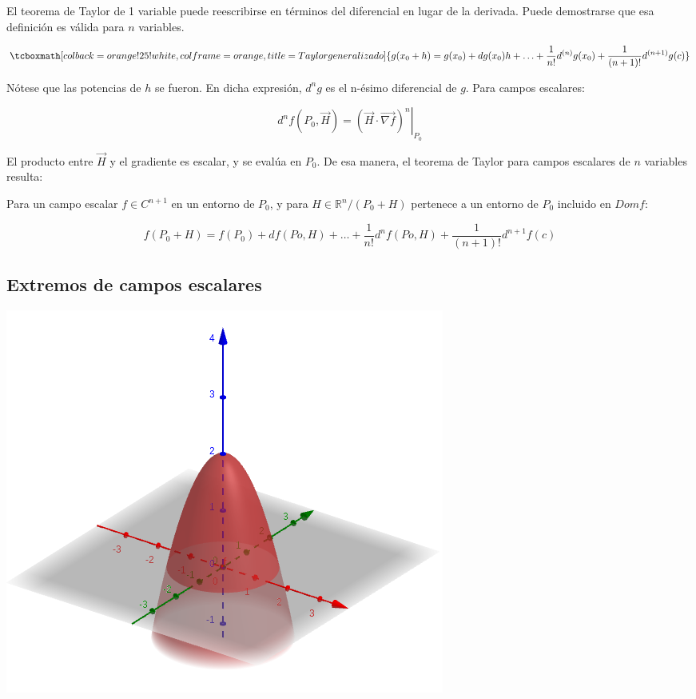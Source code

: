\documentclass{article}
\renewcommand{\Bbb}{\mathbb}
\begin{document}
El teorema de Taylor de 1 variable puede reescribirse en términos del diferencial en lugar de la derivada. Puede demostrarse que esa definición es válida para $n$ variables.

\begin{equation}
\tcboxmath[colback=orange!25!white,colframe=orange, title=Taylor generalizado]
{ g(x_0 + h) = g(x_0) + dg(x_0) h + \ldots + \frac{1}{n!} d^{(n)}g(x_0) +  \frac{1}{(n+1)!} d^{(n+1)}g(c) }
\end{equation}

Nótese que las potencias de $h$ se fueron. En dicha expresión, $d^ng$ es el n-ésimo diferencial de $g$. Para campos escalares:

\begin{equation}
d^{n}f(P_0, \overrightarrow{H}) = \left. (\overrightarrow{H} \cdot \overrightarrow{\nabla f})^n \right|_{P_0}
\end{equation}

El producto entre $\overrightarrow{H}$ y el gradiente es escalar, y se evalúa en $P_0$. De esa manera, el teorema de Taylor para campos escalares de $n$ variables resulta:

Para un campo escalar $f \in C^{n+1}$ en un entorno de $P_0$, y para $H \in \Bbb R^n/ (P_0+ H)$ pertenece a un entorno de $P_0$ incluido en $Dom f$:

\begin{equation}
f(P_0+H) = f(P_0) + df(Po, H) + \ldots + \frac{1}{n!} d^nf(Po,H) + \frac{1}{(n+1)!} d^{n+1}f(c)
\end{equation}

\subsection{Extremos de campos escalares}

\noindent
\begin{minipage}{\textwidth}
\centering
\captionsetup{type=figure}
\includegraphics[scale=0.6]{img/teo_fig015_exce01.png} 
\label{fig:exce01}
\end{minipage}
\end{document}
